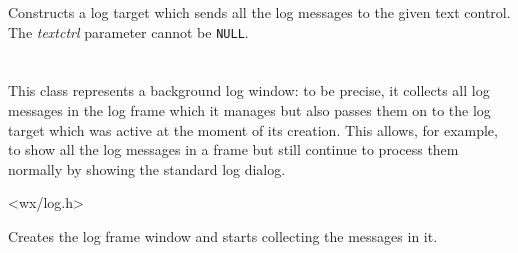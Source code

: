 
\label{wxlogtextctrlctor}


Constructs a log target which sends all the log messages to the given text
control. The {\it textctrl} parameter cannot be {\tt NULL}.


\section{}\label{wxlogwindow}

This class represents a background log window: to be precise, it collects all
log messages in the log frame which it manages but also passes them on to the
log target which was active at the moment of its creation. This allows, for
example, to show all the log messages in a frame but still continue to process
them normally by showing the standard log dialog.




<wx/log.h>




\label{wxlogwindowctor}


Creates the log frame window and starts collecting the messages in it.





